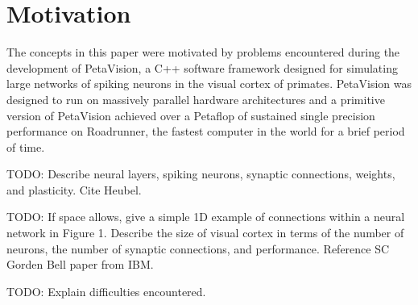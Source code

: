 \section{Motivation}

The concepts in this paper were motivated by problems encountered during
the development of PetaVision, a C++ software framework designed for simulating
large networks of spiking neurons in the visual cortex of primates.  PetaVision
was designed to run on massively parallel hardware architectures and a primitive
version of PetaVision achieved over a Petaflop of sustained single precision
performance on Roadrunner, the fastest computer in the world for a brief
period of time.

TODO: Describe neural layers, spiking neurons, synaptic connections, weights,
and plasticity. Cite Heubel.

TODO: If space allows, give a simple 1D example of connections within a neural network in
Figure 1.  Describe the size of visual cortex in terms of the number of neurons,
the number of synaptic connections, and performance.  Reference SC Gorden Bell
paper from IBM.

TODO: Explain difficulties encountered.
